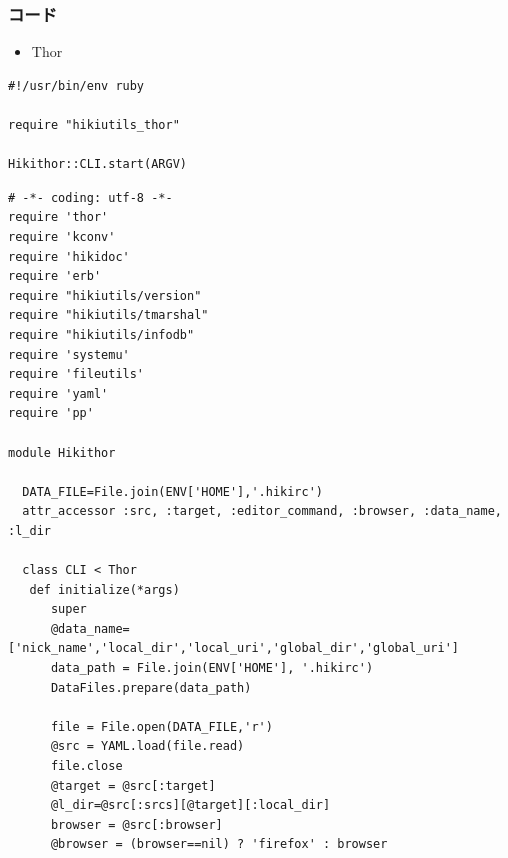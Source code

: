 \subsubsection{コード}
\begin{itemize}
\item Thor
\end{itemize}\begin{lstlisting}[style=customRuby]
#!/usr/bin/env ruby                                                             

require "hikiutils_thor"

Hikithor::CLI.start(ARGV)
\end{lstlisting}\begin{lstlisting}[style=customRuby]
# -*- coding: utf-8 -*-                                                         
require 'thor'
require 'kconv'
require 'hikidoc'
require 'erb'
require "hikiutils/version"
require "hikiutils/tmarshal"
require "hikiutils/infodb"
require 'systemu'
require 'fileutils'
require 'yaml'
require 'pp'

module Hikithor

  DATA_FILE=File.join(ENV['HOME'],'.hikirc')
  attr_accessor :src, :target, :editor_command, :browser, :data_name, :l_dir

  class CLI < Thor
   def initialize(*args)
      super
      @data_name=['nick_name','local_dir','local_uri','global_dir','global_uri']
      data_path = File.join(ENV['HOME'], '.hikirc')
      DataFiles.prepare(data_path)

      file = File.open(DATA_FILE,'r')
      @src = YAML.load(file.read)
      file.close
      @target = @src[:target]
      @l_dir=@src[:srcs][@target][:local_dir]
      browser = @src[:browser]
      @browser = (browser==nil) ? 'firefox' : browser

\end{lstlisting}
